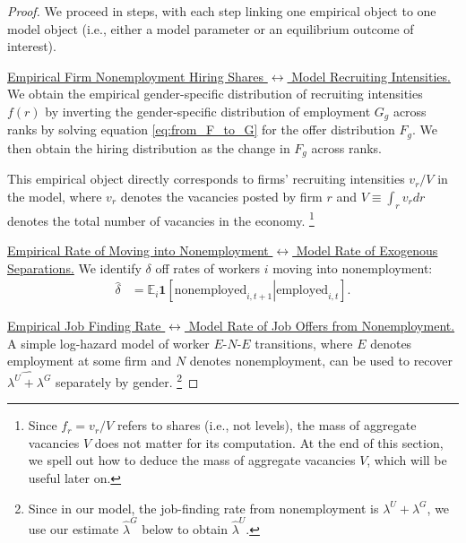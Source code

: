 %
\emph{%
    \PropLaborMarketObjects%
}%
%
\begin{proof}
    We proceed in steps, with each step linking one empirical object to one model object (i.e., either a model parameter or an equilibrium outcome of interest).

    \uline{Empirical Firm Nonemployment Hiring Shares $\leftrightarrow$ Model Recruiting Intensities.} %
    We obtain the empirical gender-specific distribution of recruiting intensities $f(r)$ by inverting the gender-specific distribution of employment $G_{g}$ across ranks by solving equation \eqref{eq:from_F_to_G} for the offer distribution $F_{g}$. We then obtain the hiring distribution as the change in $F_{g}$ across ranks.

    This empirical object directly corresponds to firms' recruiting intensities $v_{r}/V$ in the model, where $v_{r}$ denotes the vacancies posted by firm $r$ and $V \equiv \int_{r}v_{r}dr$ denotes the total number of vacancies in the economy.%
    \footnote{Since $f_{r} = v_{r}/V$ refers to shares (i.e., not levels), the mass of aggregate vacancies $V$ does not matter for its computation. At the end of this section, we spell out how to deduce the mass of aggregate vacancies $V$, which will be useful later on.} %

    \uline{Empirical Rate of Moving into Nonemployment $\leftrightarrow$ Model Rate of Exogenous Separations.} %
    We identify $\delta$ off rates of workers $i$ moving into nonemployment:
    \begin{align}
        \hat{\delta} &= \mathbb{E}_{i} \mathbf{1}\left[ \left. \text{nonemployed}_{i,t+1} \right| \text{employed}_{i,t} \right]. \label{eq:identify_delta}
    \end{align}

    \uline{Empirical Job Finding Rate $\leftrightarrow$ Model Rate of Job Offers from Nonemployment.} %
    A simple log-hazard model of worker $E$-$N$-$E$ transitions, where $E$ denotes employment at some firm and $N$ denotes nonemployment, can be used to recover $\widehat{\lambda^{U} + \lambda^{G}}$ separately by gender.%
    \footnote{Since in our model, the job-finding rate from nonemployment is $\lambda^{U} + \lambda^{G}$, we use our estimate $\hat{\lambda}^{G}$ below to obtain $\hat{\lambda}^{U}$.} %


\end{proof}
